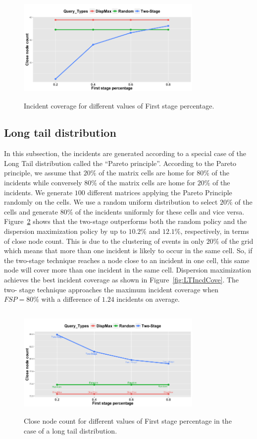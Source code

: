\documentclass{acm_proc_article-sp}
\begin{document}
\begin{figure}[!h]
\centering
\includegraphics[width=9cm ,height=5.5cm]{figuresPng/Uni-Inc_Coverage.png}
\caption{Incident coverage for different values of First stage percentage. }
\label{fig:uniIncdCove}
\end{figure}
\subsection{Long tail distribution}
In this subsection, the incidents are generated according to a special case of the Long Tail distribution called the ``Pareto principle''. According to the Pareto principle, we assume that $20\%$ of the matrix cells are home for $80\%$ of the incidents while conversely $80\%$ of the matrix cells are home for $20\%$ of the incidents. We generate $100$ different matrices applying the Pareto Principle randomly on the cells. We use a random uniform distribution to select $20\%$ of the cells and generate $80\%$ of the incidents uniformly for these cells and vice versa. Figure~\ref{fig:LTClosePeople} shows that the two-stage outperforms both the random policy and the dispersion maximization policy by up to $10.2\%$ and $12.1\%$, respectively, in terms of close node count. This is due to the clustering of events in only $20\%$ of the grid which means that more than one incident is likely to occur in the same cell. So, if the two-stage technique reaches a node close to an incident in one cell, this same node will cover more than one incident in the same cell. Dispersion maximization achieves the best incident coverage as shown in Figure~\ref{fig:LTIncdCove}. The two- stage technique approaches the maximum incident coverage when $FSP = 80\%$ with a difference of $1.24$ incidents on average.
\begin{figure}[!h]
\centering
\includegraphics[width=9cm ,height=5.5cm]{figuresPng/LT-closePeople.png}
\caption{Close node count for different values of First stage percentage in the case of a long tail distribution. }
\label{fig:LTClosePeople}
\end{figure}
\end{document}
